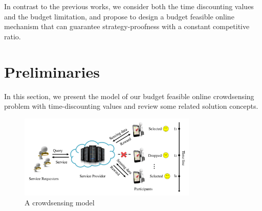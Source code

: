 \documentclass[conference,compsocconf,letterpaper,10pt]{IEEEtran}
\newcommand{\et}{{\em et al. }}
\begin{document}
In contrast to the previous works, we consider both the time discounting values and the budget limitation, and propose to design a budget feasible online mechanism that can guarantee strategy-proofness with a constant competitive ratio.



\section{Preliminaries}

In this section, we present the model of our budget feasible online crowdsensing problem with time-discounting values and review some related solution concepts.
\begin{figure}[!ht]
\centering
\includegraphics[width=8.5cm]{system2.pdf}
\vspace{-0.3cm}
\caption{A crowdsensing model}
\vspace{-0.5cm}
\end{figure}
\end{document}

